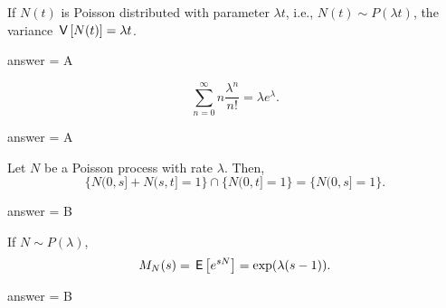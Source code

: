 \begin{exercise}[201802]
If $N(t)$ is Poisson distributed with parameter $\lambda t$, i.e., $N(t) \sim P(\lambda t)$, the variance $\,\mathsf{V}\left[N(t)\right] = \lambda t$. 
\begin{solution}
answer = A
\end{solution}
\end{exercise}

\begin{exercise}[201802]
\begin{equation*}
\sum_{n=0}^\infty n \frac{\lambda^n}{n!} = \lambda e^{\lambda}.
\end{equation*}
\begin{solution}
answer = A
\end{solution}
\end{exercise}

\begin{exercise}[201802]
Let $N$ be a Poisson process with rate $\lambda$. Then,
  \begin{equation*}
\{N(0,s]+N(s,t]=1\}\cap\{N(0,t]=1\} = \{N(0,s]=1\}.
  \end{equation*}
\begin{solution}
answer = B
\end{solution}
\end{exercise}

\begin{exercise}[201802]
If $N\sim P(\lambda)$, 
\begin{equation*}
M_{N}(s) = \,\mathsf{E}\left[e^{s N}\right] =\exp(\lambda(s - 1)).
\end{equation*}

\begin{solution}
answer = B
\end{solution}
\end{exercise}

